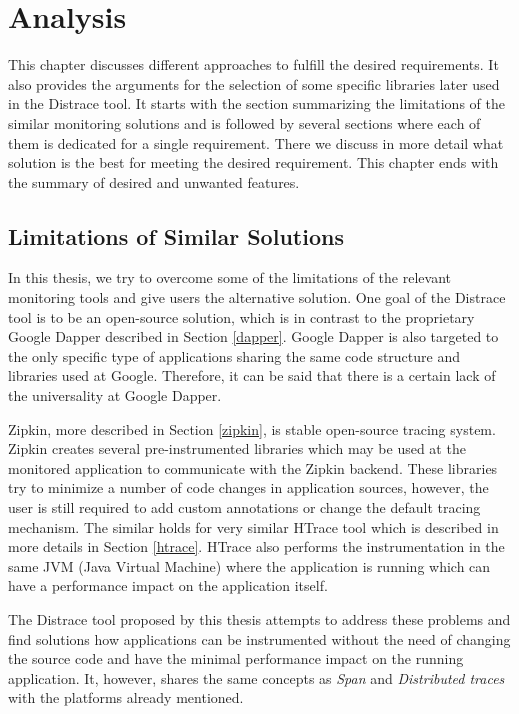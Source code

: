 \chapter{Analysis}
\label{analysis}
This chapter discusses different approaches to fulfill the desired requirements. It also provides the arguments for the selection of some specific libraries later used in the Distrace tool. It starts with the section summarizing the limitations of the similar monitoring solutions and is followed by several sections where each of them is dedicated for a single requirement. There we discuss in more detail what solution is the best for meeting the desired requirement. This chapter ends with the summary of desired and unwanted features.

\section{Limitations of Similar Solutions}
In this thesis, we try to overcome some of the limitations of the relevant monitoring tools and give users the alternative solution. One goal of the Distrace tool is to be an open-source solution, which is in contrast to the proprietary Google Dapper described in Section \ref{dapper}. Google Dapper is also targeted to the only specific type of applications sharing the same code structure and libraries used at Google. Therefore, it can be said that there is a certain lack of the universality at Google Dapper. 

Zipkin, more described in Section \ref{zipkin}, is stable open-source tracing system. Zipkin creates several pre-instrumented libraries which may be used at the monitored application to communicate with the Zipkin backend. These libraries try to minimize a number of code changes in application sources, however, the user is still required to add custom annotations or change the default tracing mechanism. The similar holds for very similar HTrace tool which is described in more details in Section \ref{htrace}. HTrace also performs the instrumentation in the same JVM (Java Virtual Machine) where the application is running which can have a performance impact on the application itself.

The Distrace tool proposed by this thesis attempts to address these problems and find solutions how applications can be instrumented without the need of changing the source code and have the minimal performance impact on the running application. It, however, shares the same concepts as \textit{Span} and\textit{ Distributed traces} with the platforms already mentioned.
